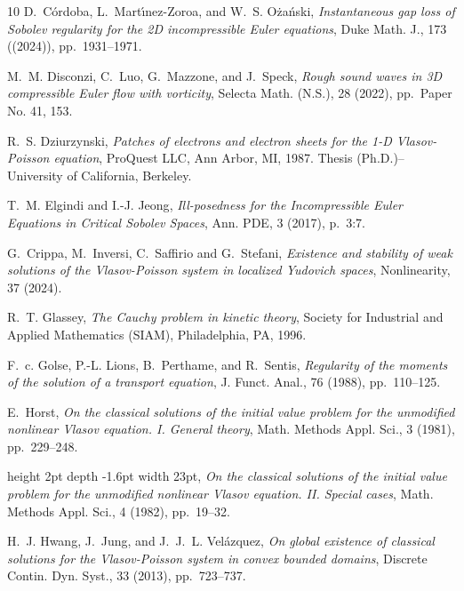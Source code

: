 \documentclass[11pt]{amsart}
\theoremstyle{definition}
\theoremstyle{remark}
\numberwithin{equation}{section}
\newcommand{\0}{\emptyset}
\begin{document}
\begin{thebibliography}{10}
		{\sc D.~C\'{o}rdoba, L.~Mart\'{\i}nez-Zoroa, and W.~S. O\.{z}a\'{n}ski}, {\em
			Instantaneous gap loss of {S}obolev regularity for the 2{D} incompressible
			{E}uler equations}, Duke Math. J., 173 ((2024)), pp.~1931--1971.
		
		{\sc M.~M. Disconzi, C.~Luo, G.~Mazzone, and J.~Speck}, {\em Rough sound waves
			in 3{D} compressible {E}uler flow with vorticity}, Selecta Math. (N.S.), 28
		(2022), pp.~Paper No. 41, 153.
		
		{\sc R.~S. Dziurzynski}, {\em Patches of electrons and electron sheets for the
			1-{D} {V}lasov-{P}oisson equation}, ProQuest LLC, Ann Arbor, MI, 1987.
		\newblock Thesis (Ph.D.)--University of California, Berkeley.
		
		{\sc T.~M. Elgindi and I.-J. Jeong}, {\em Ill-posedness for the
			{I}ncompressible {E}uler {E}quations in {C}ritical {S}obolev {S}paces}, Ann.
		PDE, 3 (2017), p.~3:7.
		
		{\sc G.~Crippa, M.~Inversi, C.~Saffirio and G.~Stefani}, {\em Existence and
			stability of weak solutions of the {V}lasov-{P}oisson system in localized
			{Y}udovich spaces}, Nonlinearity, 37 (2024).
		
		{\sc R.~T. Glassey}, {\em The {C}auchy problem in kinetic theory}, Society for
		Industrial and Applied Mathematics (SIAM), Philadelphia, PA, 1996.
		
		{\sc F.~c. Golse, P.-L. Lions, B.~Perthame, and R.~Sentis}, {\em Regularity of
			the moments of the solution of a transport equation}, J. Funct. Anal., 76
		(1988), pp.~110--125.
		
		{\sc E.~Horst}, {\em On the classical solutions of the initial value problem
			for the unmodified nonlinear {V}lasov equation. {I}. {G}eneral theory}, Math.
		Methods Appl. Sci., 3 (1981), pp.~229--248.
		
		\leavevmode\vrule height 2pt depth -1.6pt width 23pt, {\em On the classical
			solutions of the initial value problem for the unmodified nonlinear {V}lasov
			equation. {II}. {S}pecial cases}, Math. Methods Appl. Sci., 4 (1982),
		pp.~19--32.
		
		{\sc H.~J. Hwang, J.~Jung, and J.~J.~L. Vel\'azquez}, {\em On global existence
			of classical solutions for the {V}lasov-{P}oisson system in convex bounded
			domains}, Discrete Contin. Dyn. Syst., 33 (2013), pp.~723--737.
		

\end{thebibliography}
\end{document}
